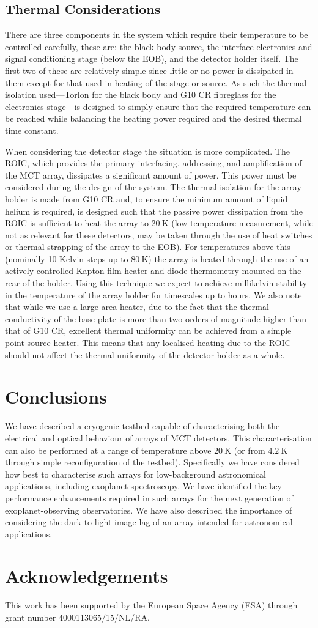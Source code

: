 \documentclass{spie}
\begin{document}
\subsection{Thermal Considerations}\label{ssec:thermal}
There are three components in the system which require their temperature to be controlled carefully, these are: the black-body source, the interface electronics and signal conditioning stage (below the EOB), and the detector holder itself. The first two of these are relatively simple since little or no power is dissipated in them except for that used in heating of the stage or source. As such the thermal isolation used---Torlon for the black body and G10 CR fibreglass for the electronics stage---is designed to simply ensure that the required temperature can be reached while balancing the heating power required and the desired thermal time constant.
\par
When considering the detector stage the situation is more complicated. The ROIC, which provides the primary interfacing, addressing, and amplification of the MCT array, dissipates a significant amount of power. This power must be considered during the design of the system. The thermal isolation for the array holder is made from G10 CR and, to ensure the minimum amount of liquid helium is required, is designed such that the passive power dissipation from the ROIC is sufficient to heat the array to $20~\si{\kelvin}$ (low temperature measurement, while not as relevant for these detectors, may be taken through the use of heat switches or thermal strapping of the array to the EOB). For temperatures above this (nominally 10-Kelvin steps up to $80~\si{\kelvin}$) the array is heated through the use of an actively controlled Kapton-film heater and diode thermometry mounted on the rear of the holder. Using this technique we expect to achieve millikelvin stability in the temperature of the array holder for timescales up to hours. We also note that while we use a large-area heater, due to the fact that the thermal conductivity of the base plate is more than two orders of magnitude higher than that of G10 CR,\cite{Marquardt2002} excellent thermal uniformity can be achieved from a simple point-source heater. This means that any localised heating due to the ROIC should not affect the thermal uniformity of the detector holder as a whole. 
%
\section{Conclusions}
We have described a cryogenic testbed capable of characterising both the electrical and optical behaviour of arrays of MCT detectors. This characterisation can also be performed at a range of temperature above $20~\si{\kelvin}$ (or from $4.2~\si{\kelvin}$ through simple reconfiguration of the testbed). Specifically we have considered how best to characterise such arrays for low-background astronomical applications, including exoplanet spectroscopy. We have identified the key performance enhancements required in such arrays for the next generation of exoplanet-observing observatories. We have also described the importance of considering the dark-to-light image lag of an array intended for astronomical applications.
%
\section*{Acknowledgements}
This work has been supported by the European Space Agency (ESA) through grant number 4000113065/15/NL/RA.


\end{document}

